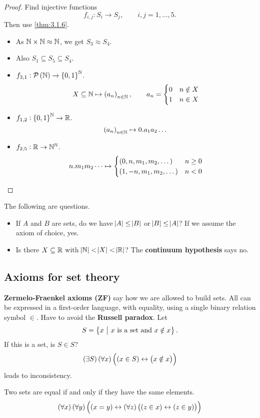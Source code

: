 \begin{proof}
Find injective functions
$$ f_{i, j} : S_i \to S_j, \qquad i, j = 1, \dots, 5. $$
Then use \ref{thm:3.1.6}.
\begin{itemize}
\item As $ \mathbb{N} \times \mathbb{N} \approx \mathbb{N} $, we get $ S_3 \approx S_4 $.
\item Also $ S_1 \subseteq S_5 \subseteq S_4 $.
\item $ f_{3, 1} : \PPP\br{\NN} \to \cbr{0, 1}^\NN $.
$$ X \subseteq \NN \mapsto \br{a_n}_{n \in \NN}, \qquad a_n =
\begin{cases}
0 & n \notin X \\
1 & n \in X
\end{cases}
$$
\item $ f_{1, 2} : \cbr{0, 1}^\NN \to \RR $.
$$ \br{a_n}_{n \in \NN} \mapsto 0 . a_1a_2 \dots $$
\item $ f_{2, 5} : \mathbb{R} \to \mathbb{N}^{\mathbb{N}} $.
$$ n . m_1m_2 \dots \mapsto
\begin{cases}
\br{0, n, m_1, m_2, \dots} & n \ge 0 \\
\br{1, -n, m_1, m_2, \dots} & n < 0
\end{cases}
$$
\end{itemize}
\end{proof}

The following are questions.
\begin{itemize}
\item If $ A $ and $ B $ are sets, do we have $ \abs{A} \le \abs{B} $ or $ \abs{B} \le \abs{A} $? If we assume the axiom of choice, yes.
\item Is there $ X \subseteq \mathbb{R} $ with $ \abs{\mathbb{N}} < \abs{X} < \abs{\mathbb{R}} $? The \textbf{continuum hypothesis} says no.
\end{itemize}

\subsection{Axioms for set theory}

\textbf{Zermelo-Fraenkel axioms (ZF)} say how we are allowed to build sets. All can be expressed in a first-order language, with equality, using a single binary relation symbol $ \in $. Have to avoid the \textbf{Russell paradox}. Let
$$ S = \cbr{x \st x \ \text{is a set and} \ x \notin x}. $$
If this is a set, is $ S \in S $?
$$ \teb{S}\fab{x}\iffb{\inb{x}{S}}{\nib{x}{x}} $$
leads to inconsistency.

\begin{axiom**}
Two sets are equal if and only if they have the same elements.
$$ \fab{x}\fab{y}\iffb{\eqb{x}{y}}{\fab{z}\iffb{\inb{z}{x}}{\inb{z}{y}}} $$
\end{axiom**}

